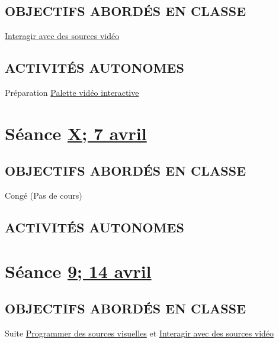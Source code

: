 \documentclass[
  french,
]{book}
\begin{document}
\hypertarget{objectifs-aborduxe9s-en-classe-8}{%
\subsection{OBJECTIFS ABORDÉS EN CLASSE}\label{objectifs-aborduxe9s-en-classe-8}}

\protect\hyperlink{interagir}{Interagir avec des sources vidéo}

\hypertarget{activituxe9s-autonomes-8}{%
\subsection{ACTIVITÉS AUTONOMES}\label{activituxe9s-autonomes-8}}

Préparation \protect\hyperlink{sommatif_4}{Palette vidéo interactive}

\hypertarget{semaine_10}{%
\section{\texorpdfstring{Séance \protect\hyperlink{semaine_10}{X; 7 avril}}{Séance X; 7 avril}}\label{semaine_10}}

\hypertarget{objectifs-aborduxe9s-en-classe-9}{%
\subsection{OBJECTIFS ABORDÉS EN CLASSE}\label{objectifs-aborduxe9s-en-classe-9}}

Congé (Pas de cours)

\hypertarget{activituxe9s-autonomes-9}{%
\subsection{ACTIVITÉS AUTONOMES}\label{activituxe9s-autonomes-9}}

\hypertarget{semaine_11}{%
\section{\texorpdfstring{Séance \protect\hyperlink{semaine_11}{9; 14 avril}}{Séance 9; 14 avril}}\label{semaine_11}}

\hypertarget{objectifs-aborduxe9s-en-classe-10}{%
\subsection{OBJECTIFS ABORDÉS EN CLASSE}\label{objectifs-aborduxe9s-en-classe-10}}

Suite \protect\hyperlink{programmer}{Programmer des sources visuelles}
et \protect\hyperlink{interagir}{Interagir avec des sources vidéo}
\end{document}
